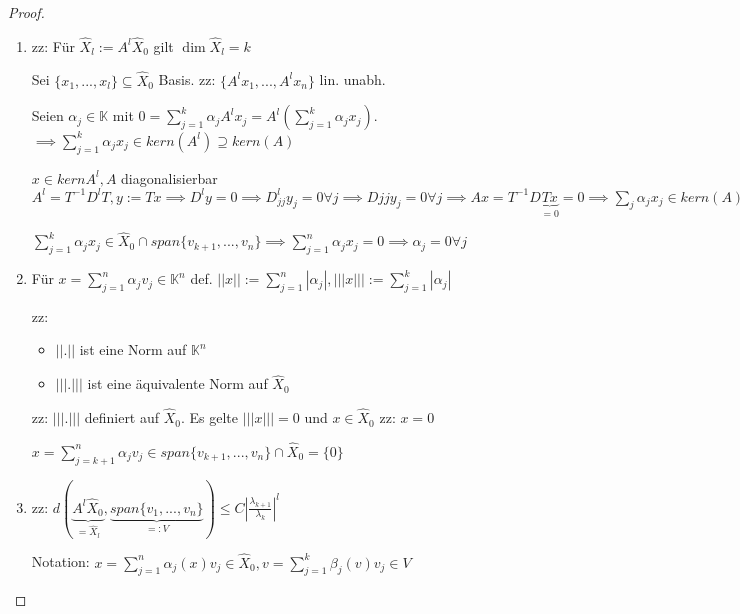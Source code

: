 \begin{proof}
	\begin{enumerate}
		\item zz: Für $\hat{X}_l := A^l \hat{X}_0$ gilt $\dim \hat{X}_l = k$
		
		Sei $\{x_1, ..., x_l\} \subseteq \hat{X}_0$ Basis. zz: $\{A^lx_1, ..., A^lx_n\}$ lin. unabh.
		
		Seien $\alpha_j \in \mathbb{K}$ mit $0 = \sum_{j=1}^{k} \alpha_j A^l x_j = A^l \left(\sum_{j=1}^{k} \alpha_j x_j \right)$. $\implies \sum_{j=1}^{k} \alpha_j x_j \in kern(A^l) \supseteq kern(A)$
		
		$x \in kern A^l, A$ diagonalisierbar $A^l = T^{-1}D^lT, y:=Tx \implies D^ly = 0 \implies D_{jj}^l y_j = 0 \forall j \implies D{jj}y_j = 0 \forall j \implies Ax = T^{-1}D\underbrace{Tx}_{=0} = 0 \implies \sum_j \alpha_j x_j \in kern(A) \subseteq span\{v_{k+1}, ..., v_n\}$
		
		$\sum_{j=1}^{k} \alpha_j x_j \in \hat{X}_0 \cap span\{v_{k+1}, ..., v_n\} \implies \sum_{j=1}^{n} \alpha_j x_j = 0 \implies \alpha_j = 0 \forall j$
		
		\item Für $x = \sum_{j=1}^{n} \alpha_j v_j \in \mathbb{K}^n$ def. $||x|| := \sum_{j=1}^{n} |\alpha_j|, |||x|||:= \sum_{j=1}^{k} |\alpha_j|$
		
		zz: \begin{itemize}
			\item $||.||$ ist eine Norm auf $\mathbb{K}^n$
			\item $|||.|||$ ist eine äquivalente Norm auf $\hat{X}_0$
		\end{itemize}
		
		zz: $|||.|||$ definiert auf $\hat{X}_0$. Es gelte $|||x||| = 0$ und $x \in \hat{X}_0$ zz: $x=0$
		
		$x = \sum_{j=k+1}^{n} \alpha_j v_j \in span\{v_{k+1}, ..., v_n\} \cap \hat{X}_0 = \{0\}$
		
		\item zz: $d(\underbrace{A^l\hat{X}_0}_{=\hat{X}_l}, \underbrace{span\{v_1, ..., v_n\}}_{=:V}) \leq C \left|\frac{\lambda_{k+1}}{\lambda_k}\right|^l$
		
		Notation: $x = \sum_{j=1}^{n} \alpha_j(x) v_j \in \hat{X}_0, v = \sum_{j=1}^{k} \beta_j(v)v_j \in V$
		

\end{enumerate}
\end{proof}
